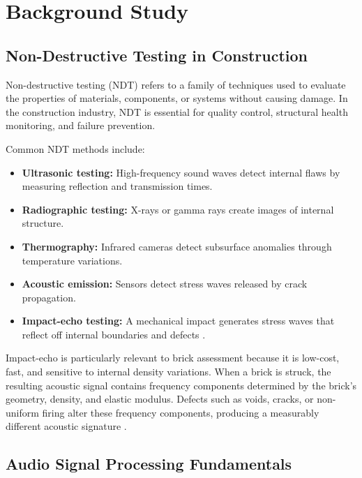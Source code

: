\documentclass[12pt,a4paper,oneside]{report}
\begin{document}
\chapter{Background Study}
\label{ch:background}

\section{Non-Destructive Testing in Construction}

Non-destructive testing (NDT) refers to a family of techniques used to evaluate the properties of materials, components, or systems without causing damage. In the construction industry, NDT is essential for quality control, structural health monitoring, and failure prevention.

Common NDT methods include:
\begin{itemize}
    \item \textbf{Ultrasonic testing:} High-frequency sound waves detect internal flaws by measuring reflection and transmission times.
    \item \textbf{Radiographic testing:} X-rays or gamma rays create images of internal structure.
    \item \textbf{Thermography:} Infrared cameras detect subsurface anomalies through temperature variations.
    \item \textbf{Acoustic emission:} Sensors detect stress waves released by crack propagation.
    \item \textbf{Impact-echo testing:} A mechanical impact generates stress waves that reflect off internal boundaries and defects \cite{rotor2023}.
\end{itemize}

Impact-echo is particularly relevant to brick assessment because it is low-cost, fast, and sensitive to internal density variations. When a brick is struck, the resulting acoustic signal contains frequency components determined by the brick's geometry, density, and elastic modulus. Defects such as voids, cracks, or non-uniform firing alter these frequency components, producing a measurably different acoustic signature \cite{rotor2023,kim2025}.

\section{Audio Signal Processing Fundamentals}
\end{document}
